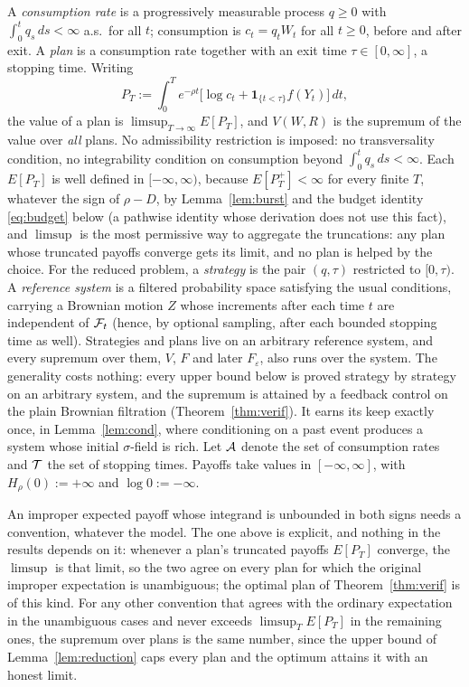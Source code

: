 \begin{adefinition}\label{def:plans}
A \emph{consumption rate} is a progressively measurable process $q\ge0$ with $\int_0^t q_s\,ds<\infty$ a.s.\ for all $t$; consumption is $c_t=q_tW_t$ for all $t\ge0$, before and after exit. A \emph{plan} is a consumption rate together with an exit time $\tau\in[0,\infty]$, a stopping time. Writing
\[
P_T:=\int_0^T e^{-\rho t}\big[\log c_t+\mathbf 1_{\{t<\tau\}}f(Y_t)\big]\,dt,
\]
the value of a plan is $\limsup_{T\to\infty}E[P_T]$, and $V(W,R)$ is the supremum of the value over \emph{all} plans. No admissibility restriction is imposed: no transversality condition, no integrability condition on consumption beyond $\int_0^tq_s\,ds<\infty$. Each $E[P_T]$ is well defined in $[-\infty,\infty)$, because $E[P_T^+]<\infty$ for every finite $T$, whatever the sign of $\rho-D$, by Lemma~\ref{lem:burst} and the budget identity \eqref{eq:budget} below (a pathwise identity whose derivation does not use this fact), and $\limsup$ is the most permissive way to aggregate the truncations: any plan whose truncated payoffs converge gets its limit, and no plan is helped by the choice. For the reduced problem, a \emph{strategy} is the pair $(q,\tau)$ restricted to $[0,\tau)$. A \emph{reference system} is a filtered probability space satisfying the usual conditions, carrying a Brownian motion $Z$ whose increments after each time $t$ are independent of $\mathcal{F}_t$ (hence, by optional sampling, after each bounded stopping time as well). Strategies and plans live on an arbitrary reference system, and every supremum over them, $V$, $F$ and later $F_\varepsilon$, also runs over the system. The generality costs nothing: every upper bound below is proved strategy by strategy on an arbitrary system, and the supremum is attained by a feedback control on the plain Brownian filtration (Theorem~\ref{thm:verif}). It earns its keep exactly once, in Lemma~\ref{lem:cond}, where conditioning on a past event produces a system whose initial $\sigma$-field is rich. Let $\mathcal{A}$ denote the set of consumption rates and $\mathcal{T}$ the set of stopping times. Payoffs take values in $[-\infty,\infty]$, with $H_\rho(0):=+\infty$ and $\log0:=-\infty$.
\end{adefinition}

\begin{aremark}\label{rem:conv}
An improper expected payoff whose integrand is unbounded in both signs needs a convention, whatever the model. The one above is explicit, and nothing in the results depends on it: whenever a plan's truncated payoffs $E[P_T]$ converge, the $\limsup$ is that limit, so the two agree on every plan for which the original improper expectation is unambiguous; the optimal plan of Theorem~\ref{thm:verif} is of this kind. For any other convention that agrees with the ordinary expectation in the unambiguous cases and never exceeds $\limsup_TE[P_T]$ in the remaining ones, the supremum over plans is the same number, since the upper bound of Lemma~\ref{lem:reduction} caps every plan and the optimum attains it with an honest limit.
\end{aremark}

